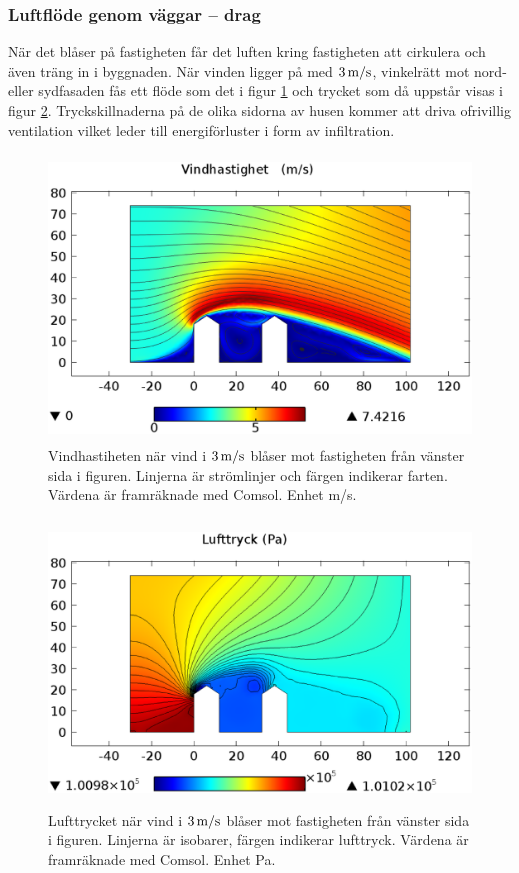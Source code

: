 \subsubsection{Luftflöde genom väggar – drag}

När det blåser på fastigheten får det luften kring fastigheten att cirkulera och även träng in i 
byggnaden. När vinden ligger på med $\unit[3]{m/s}$, vinkelrätt mot nord- eller sydfasaden fås 
ett flöde som det i figur \ref{fig:windspeed} och trycket som då uppstår visas i figur 
\ref{fig:windpressure}. Tryckskillnaderna på de olika sidorna av husen kommer att driva 
ofrivillig ventilation vilket leder till energiförluster i form av infiltration.

\begin{figure}[hpbt]
\centering
\includegraphics[width=127mm,height=76mm]{images/wind3mshdpi.eps}
\caption{\label{fig:windspeed}Vindhastiheten när vind i $\unit[3]{m/s}$ blåser mot fastigheten 
från vänster sida i figuren. Linjerna är strömlinjer och färgen indikerar farten. Värdena är 
framräknade med Comsol. Enhet m/s.}
\end{figure}


\begin{figure}[hpbt]
\centering
\includegraphics[width=127mm,height=76mm]{images/pressure3mshdpi.eps}

\caption{\label{fig:windpressure}Lufttrycket när vind i $\unit[3]{m/s}$ blåser mot fastigheten från vänster sida i figuren. Linjerna är isobarer, färgen indikerar lufttryck. Värdena är framräknade med Comsol. Enhet Pa.}
\end{figure}

